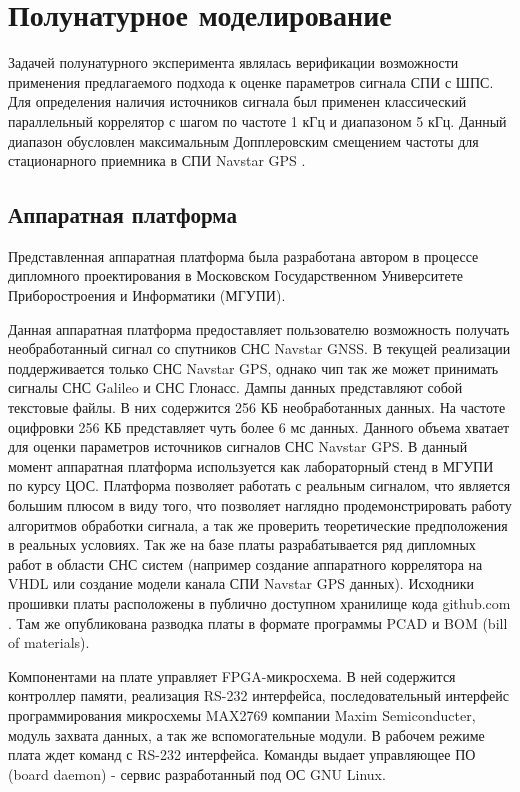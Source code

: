 \chapter{Полунатурное моделирование}
\label{ss:hw}

Задачей полунатурного эксперимента являлась верификации возможности применения предлагаемого подхода к оценке параметров сигнала СПИ с ШПС. Для определения наличия источников
сигнала был применен классический параллельный коррелятор \cite{tsui} с шагом по частоте 1 кГц и диапазоном 5 кГц. Данный диапазон обусловлен максимальным Допплеровским
смещением частоты для стационарного приемника в СПИ Navstar GPS \cite{shahtarin_sync, tsui}. 

\section{Аппаратная платформа}
Представленная аппаратная платформа была разработана автором в процессе дипломного проектирования в Московском Государственном Университете Приборостроения и Информатики (МГУПИ).

Данная аппаратная платформа предоставляет пользователю возможность получать необработанный сигнал со спутников СНС Navstar GNSS. В текущей реализации поддерживается только 
СНС Navstar GPS, однако чип так же может принимать сигналы СНС Galileo и СНС Глонасс. Дампы данных представляют собой текстовые файлы. В них содержится 256 КБ необработанных данных.
На частоте оцифровки 256 КБ представляет чуть более 6 мс данных. Данного объема хватает для оценки параметров источников сигналов СНС Navstar GPS.
В данный момент аппаратная платформа используется как лабораторный стенд в МГУПИ по курсу ЦОС. Платформа позволяет работать с реальным сигналом, что является большим плюсом в
виду того, что позволяет наглядно продемонстрировать работу алгоритмов обработки сигнала, а так же проверить теоретические предположения в реальных условиях.
Так же на базе платы разрабатывается ряд дипломных работ в области СНС систем (например создание аппаратного коррелятора на VHDL или создание модели канала 
СПИ Navstar GPS данных). Исходники прошивки платы расположены в публично доступном хранилище кода github.com \cite{github-gpsproject}.
Там же опубликована разводка платы в формате программы PCAD и BOM (bill of materials).

Компонентами на плате управляет FPGA-микросхема. В ней содержится контроллер памяти, реализация RS-232 интерфейса, последовательный интерфейс программирования микросхемы
MAX2769 компании Maxim Semiconducter, модуль захвата данных, а так же вспомогательные модули. В рабочем режиме плата ждет команд с RS-232 интерфейса.
Команды выдает управляющее ПО (board daemon) - сервис разработанный под ОС GNU Linux.


